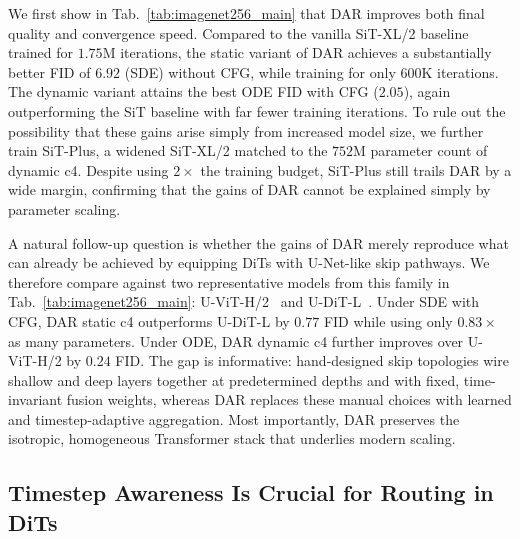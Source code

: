 \documentclass[]{ant_tech_report}
\begin{document}
We first show in Tab.~\ref{tab:imagenet256_main} that \textsc{DAR} improves both final quality and convergence speed. Compared to the vanilla SiT-XL/2 baseline trained for $1.75\text{M}$ iterations, the static variant of \textsc{DAR} achieves a substantially better FID of $6.92$ (SDE) without CFG, while training for only $600\text{K}$ iterations. The dynamic variant attains the best ODE FID with CFG ($2.05$), again outperforming the SiT baseline with far fewer training iterations. To rule out the possibility that these gains arise simply from increased model size, we further train SiT-Plus, a widened SiT-XL/2 matched to the $752$M parameter count of dynamic c4. Despite using $2\times$ the training budget, SiT-Plus still trails \textsc{DAR} by a wide margin, confirming that the gains of \textsc{DAR} cannot be explained simply by parameter scaling.

A natural follow-up question is whether the gains of \textsc{DAR} merely reproduce what can already be achieved by equipping DiTs with U-Net-like skip pathways. We therefore compare against two representative models from this family in Tab.~\ref{tab:imagenet256_main}: U-ViT-H/2~\citep{bao2023all} and U-DiT-L~\citep{tian2024u}. Under SDE with CFG, \textsc{DAR} static c4 outperforms U-DiT-L by $0.77$ FID while using only $0.83\times$ as many parameters. Under ODE, \textsc{DAR} dynamic c4 further improves over U-ViT-H/2 by $0.24$ FID. The gap is informative: hand-designed skip topologies wire shallow and deep layers together at predetermined depths and with fixed, time-invariant fusion weights, whereas \textsc{DAR} replaces these manual choices with learned and timestep-adaptive aggregation. Most importantly, \textsc{DAR} preserves the isotropic, homogeneous Transformer stack that underlies modern scaling.


\subsection{Timestep Awareness Is Crucial for Routing in DiTs}
\label{sec:time}
\end{document}
